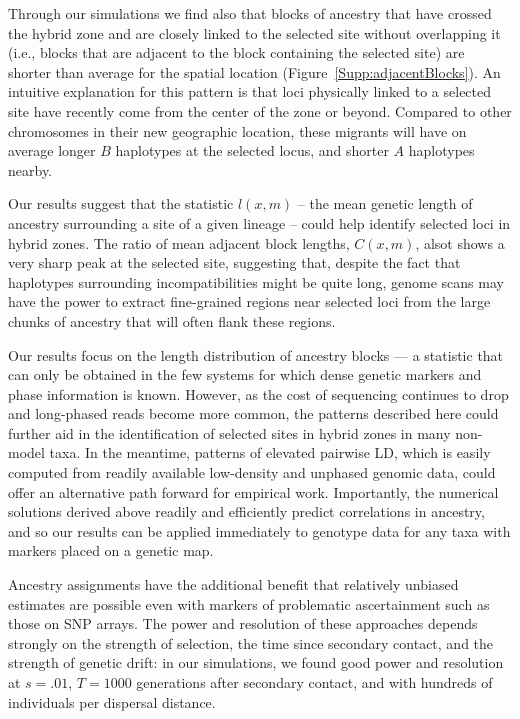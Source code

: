 \documentclass[11pt,letterpaper]{article}
\begin{document}
Through our simulations we find also that blocks of ancestry that have crossed the hybrid zone and are closely linked to the selected site without overlapping it (i.e., blocks that are adjacent to the block containing the selected site) are shorter than average for the spatial location (Figure~\ref{Supp:adjacentBlocks}). 
An intuitive explanation for this pattern is that loci physically linked to a selected site have recently come from the center of the zone or beyond. 
Compared to other chromosomes in their new geographic location, these migrants will have on average longer $B$ haplotypes at the selected locus, and shorter $A$ haplotypes nearby. 

Our results suggest that the statistic $l(x,m)$ 
-- the mean genetic length of ancestry surrounding a site of a given lineage --
could help identify selected loci in hybrid zones. 
The ratio of mean adjacent block lengths, $C(x,m)$, alsot shows a very sharp peak at the selected site,
suggesting that, despite the fact that haplotypes surrounding incompatibilities might be quite long, 
genome scans may have the power to extract fine-grained regions near selected loci from the large chunks of ancestry that will often flank these regions. 

Our results focus on the length distribution of ancestry blocks --- a statistic that can only be obtained in the few systems for which dense genetic markers and phase information is known. 
However, as the cost of sequencing continues to drop and long-phased reads become more common, the patterns described here could further aid in the identification of selected sites in hybrid zones in many non-model taxa. 
In the meantime, patterns of elevated pairwise LD, which is easily computed from readily available low-density and unphased genomic data, could offer an alternative path forward for empirical work. 
Importantly, the numerical solutions derived above readily and efficiently predict correlations in ancestry, and so our results can be applied immediately to genotype data for any taxa with markers placed on a genetic map.

Ancestry assignments have the additional benefit that relatively unbiased estimates are possible even with markers of problematic ascertainment
such as those on SNP arrays.
The power and resolution of these approaches depends strongly on the strength of selection,
the time since secondary contact,
and the strength of genetic drift:
in our simulations,
we found good power and resolution at $s=.01$, $T=1000$ generations after secondary contact,
and with hundreds of individuals per dispersal distance.
\end{document}

